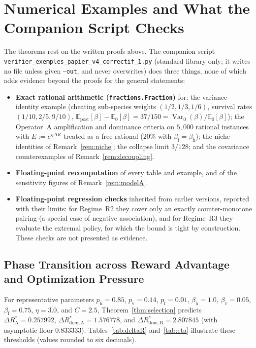 \documentclass[11pt,a4paper]{article}
\newcommand{\E}{\mathbb{E}}
\newcommand{\Var}{\operatorname{Var}}
\begin{document}
\section{Numerical Examples and What the Companion Script Checks}\label{sec:verif}

The theorems rest on the written proofs above. The companion script \texttt{verifier\_}\allowbreak\texttt{exemples\_}\allowbreak\texttt{papier\_v4\_}\allowbreak\texttt{correctif\_1.py} (standard library only; it writes no file unless given \texttt{--out}, and never overwrites) does three things, none of which adds evidence beyond the proofs for the general statements:
\begin{itemize}
  \item \textbf{Exact rational arithmetic (\texttt{fractions.Fraction})} for: the variance-identity example (cheating sub-species weights $(1/2, 1/3, 1/6)$, survival rates $(1/10, 2/5, 9/10)$, $\E_{\mathrm{post}}[\beta] - \E_0[\beta] = 37/150 = \Var_0(\beta)/\E_0[\beta]$); the Operator~A amplification and dominance criteria on $5{,}000$ rational instances with $E := e^{\eta\Delta R}$ treated as a free rational ($20\%$ with $\beta_{\mathrm{f}} = \beta_{\mathrm{h}}$); the niche identities of Remark~\ref{rem:niche}; the collapse limit $3/128$; and the covariance counterexamples of Remark~\ref{rem:decoupling}.
  \item \textbf{Floating-point recomputation} of every table and example, and of the sensitivity figures of Remark~\ref{rem:modelA}.
  \item \textbf{Floating-point regression checks} inherited from earlier versions, reported with their limits: for Regime~R2 they cover only an exactly counter-monotone pairing (a special case of negative association), and for Regime~R3 they evaluate the extremal policy, for which the bound is tight by construction. These checks are not presented as evidence.
\end{itemize}

\subsection{Phase Transition across Reward Advantage and Optimization Pressure}

For representative parameters $p_{\mathrm{h}} = 0.85$, $p_{\mathrm{v}} = 0.14$, $p_{\mathrm{f}} = 0.01$, $\beta_{\mathrm{h}} = 1.0$, $\beta_{\mathrm{v}} = 0.05$, $\beta_{\mathrm{f}} = 0.75$, $\eta = 3.0$, and $C = 2.5$, Theorem~\ref{thm:selection} predicts $\Delta R_{\mathrm{A}}^* = 0.257992$, $\Delta R_{\mathrm{dom, A}}^* = 1.576778$, and $\Delta R_{\mathrm{dom, B}}^* = 2.807845$ (with asymptotic floor $0.833333$). Tables~\ref{tab:deltaR} and~\ref{tab:eta} illustrate these thresholds (values rounded to six decimals).
\end{document}
